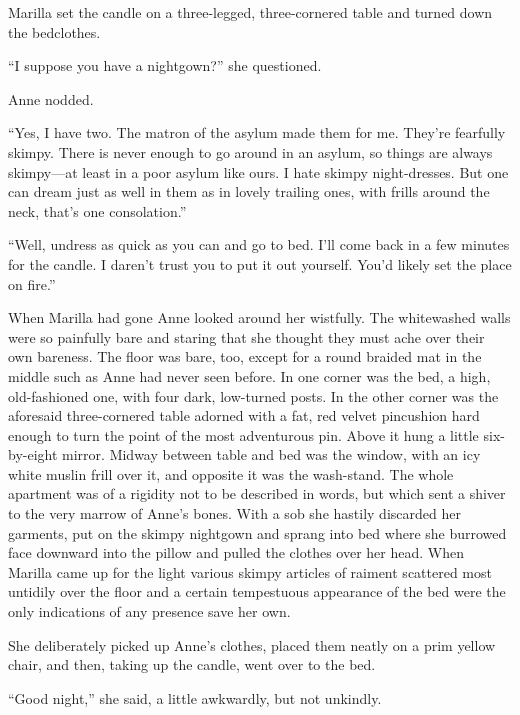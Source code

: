 \documentclass[a4paper]{article}
\begin{document}
Marilla set the candle on a three-legged, three-cornered table and turned down the bedclothes.

``I suppose you have a nightgown?'' she questioned.

Anne nodded.


``Yes, I have two. The matron of the asylum made them for me. They're fearfully skimpy. There is never enough to go around in an asylum, so things are always skimpy---at least in a poor asylum like ours. I hate skimpy night-dresses. But one can dream just as well in them as in lovely trailing ones, with frills around the neck, that's one consolation.''

``Well, undress as quick as you can and go to bed. I'll come back in a few minutes for the candle. I daren't trust you to put it out yourself. You'd likely set the place on fire.''

When Marilla had gone Anne looked around her wistfully. The whitewashed walls were so painfully bare and staring that she thought they must ache over their own bareness. The floor was bare, too, except for a round braided mat in the middle such as Anne had never seen before. In one corner was the bed, a high, old-fashioned one, with four dark, low-turned posts. In the other corner was the aforesaid three-cornered table adorned with a fat, red velvet pincushion hard enough to turn the point of the most adventurous pin. Above it hung a little six-by-eight mirror. Midway between table and bed was the window, with an icy white muslin frill over it, and opposite it was the wash-stand. The whole apartment was of a rigidity not to be described in words, but which sent a shiver to the very marrow of Anne's bones. With a sob she hastily discarded her garments, put on the skimpy nightgown and sprang into bed where she burrowed face downward into the pillow and pulled the clothes over her head. When Marilla came up for the light various skimpy articles of raiment scattered most untidily over the floor and a certain tempestuous appearance of the bed were the only indications of any presence save her own.

She deliberately picked up Anne's clothes, placed them neatly on a prim yellow chair, and then, taking up the candle, went over to the bed.

``Good night,'' she said, a little awkwardly, but not unkindly.
\end{document}
